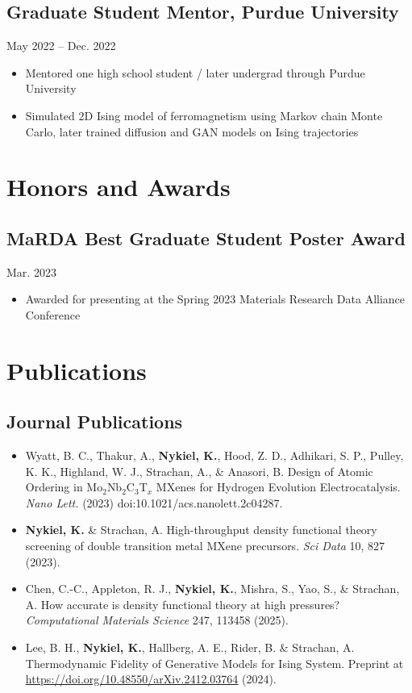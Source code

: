 \documentclass[11pt]{article}
\begin{document}
\subsection*{Graduate Student Mentor, Purdue University}
May 2022 -- Dec. 2022
\begin{itemize}[leftmargin=1.5em]
    \item Mentored one high school student / later undergrad through Purdue University
    \item Simulated 2D Ising model of ferromagnetism using Markov chain Monte Carlo, later trained diffusion and GAN models on Ising trajectories
\end{itemize}

\section*{Honors and Awards}

\subsection*{MaRDA Best Graduate Student Poster Award}
Mar. 2023
\begin{itemize}[leftmargin=1.5em]
    \item Awarded for presenting at the Spring 2023 Materials Research Data Alliance Conference
\end{itemize}

\section*{Publications}

\subsection*{Journal Publications}
\begin{itemize}[leftmargin=1.5em]
    \item Wyatt, B. C., Thakur, A., \textbf{Nykiel, K.}, Hood, Z. D., Adhikari, S. P., Pulley, K. K., Highland, W. J., Strachan, A., \& Anasori, B. Design of Atomic Ordering in Mo$_2$Nb$_2$C$_3$T$_x$ MXenes for Hydrogen Evolution Electrocatalysis. \textit{Nano Lett.} (2023) doi:10.1021/acs.nanolett.2c04287.
    \item \textbf{Nykiel, K.} \& Strachan, A. High-throughput density functional theory screening of double transition metal MXene precursors. \textit{Sci Data} 10, 827 (2023).
    \item Chen, C.-C., Appleton, R. J., \textbf{Nykiel, K.}, Mishra, S., Yao, S., \& Strachan, A. How accurate is density functional theory at high pressures? \textit{Computational Materials Science} 247, 113458 (2025).
    \item Lee, B. H., \textbf{Nykiel, K.}, Hallberg, A. E., Rider, B. \& Strachan, A. Thermodynamic Fidelity of Generative Models for Ising System. Preprint at \url{https://doi.org/10.48550/arXiv.2412.03764} (2024).
\end{itemize}
\end{document}
